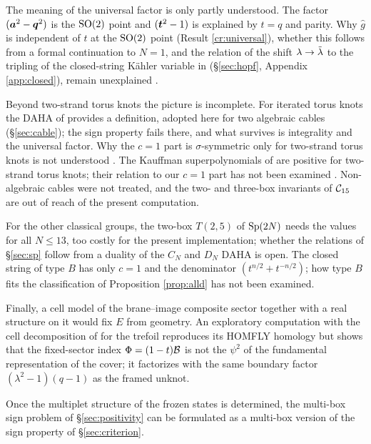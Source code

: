 The meaning of the universal factor is only partly understood. The factor $(\bm{a}^2 - \bm{q}^2)$ is the $\mathrm{SO}(2)$ point and $(\bm{t}^2 - 1)$ is explained by $t = q$ and parity. Why $\hat g$ is independent of $t$ at the $\mathrm{SO}(2)$ point (Result \ref{cr:universal}), whether this follows from a formal continuation to $N = 1$, and the relation of the shift $\lambda \to \tilde\lambda$ to the tripling of the closed-string K\"ahler variable in \cite{AM22} (\S\ref{sec:hopf}, Appendix \ref{app:closed}), remain unexplained \open.

Beyond two-strand torus knots the picture is incomplete. For iterated torus knots the DAHA of \cite{CD14} provides a definition, adopted here for two algebraic cables (\S\ref{sec:cable}); the sign property fails there, and what survives is integrality and the universal factor. Why the $c = 1$ part is $\sigma$-symmetric only for two-strand torus knots is not understood \open. The Kauffman superpolynomials of \cite{GW05} are positive for two-strand torus knots; their relation to our $c = 1$ part has not been examined \open. Non-algebraic cables were not treated, and the two- and three-box invariants of $\mathcal{C}_{15}$ are out of reach of the present computation.

For the other classical groups, the two-box $T(2,5)$ of $\mathrm{Sp}(2N)$ needs the values for all $N \le 13$, too costly for the present implementation; whether the relations of \S\ref{sec:sp} follow from a duality of the $C_N$ and $D_N$ DAHA is open. The closed string of type $B$ \cite{AM22} has only $c = 1$ and the denominator $(t^{n/2} + t^{-n/2})$; how type $B$ fits the classification of Proposition \ref{prop:alld} has not been examined.

Finally, a cell model of the brane--image composite sector together with a real structure on it would fix $E$ from geometry. An exploratory computation with the cell decomposition of \cite{ORS12} for the trefoil reproduces its HOMFLY homology but shows that the fixed-sector index $\Phi = (1-t)\mathcal{B}$ is not the $\psi^2$ of the fundamental representation of the cover; it factorizes with the same boundary factor $(\lambda^2-1)(q-1)$ as the framed unknot.

Once the multiplet structure of the frozen states is determined, the multi-box sign problem of \S\ref{sec:positivity} can be formulated as a multi-box version of the sign property of \S\ref{sec:criterion}.
